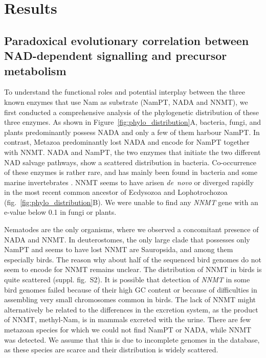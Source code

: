 
\section{Results}

\subsection{Paradoxical evolutionary correlation between NAD-dependent signalling and precursor metabolism}


To understand the functional roles and potential interplay between the three known enzymes that use Nam as substrate (NamPT, NADA and NNMT), we first conducted a comprehensive analysis of the phylogenetic distribution of these three enzymes.  As shown in Figure~\ref{fig:phylo_distribution}A, bacteria, fungi, and plants predominantly possess NADA and only a few of them harbour NamPT. In contrast, Metazoa predominantly lost NADA and encode for NamPT together with NNMT. NADA and NamPT, the  two enzymes that initiate the two different NAD salvage pathways,  show a scattered distribution in bacteria. Co-occurrence of these enzymes is rather rare, and has mainly been found in bacteria \cite{Gazzaniga2009} and some marine invertebrates \cite{Gossmann2012FEBS}.
NNMT seems to have arisen \textit{de~novo} or diverged rapidly in the most recent common ancestor of Ecdysozoa and Lophotrochozoa (fig.~\ref{fig:phylo_distribution}B). We were unable to find any \textit{NNMT} gene with an e-value below 0.1 in fungi or plants.

Nematodes are the only organisms, where we observed a concomitant presence of NADA and NNMT. In deuterostomes, the only large clade that possesses only NamPT and seems to have lost NNMT are Sauropsida, and among them especially birds. The reason why about half of the sequenced bird genomes do not seem to encode for NNMT remains unclear. The distribution of NNMT in birds is quite scattered (suppl. fig.~S2). It is possible that detection of \textit{NNMT} in some bird genomes failed because  of their high GC content \cite{Hron2015} or because of difficulties in assembling very small chromosomes common in birds. The lack of NNMT might alternatively be related to the differences in the excretion system, as the product of NNMT, methyl-Nam, is in mammals excreted with the urine. There are few metazoan species for which we could not find NamPT or NADA, while NNMT was detected. We assume that this is due to incomplete genomes in the database, as these species are scarce and their distribution is widely scattered.


